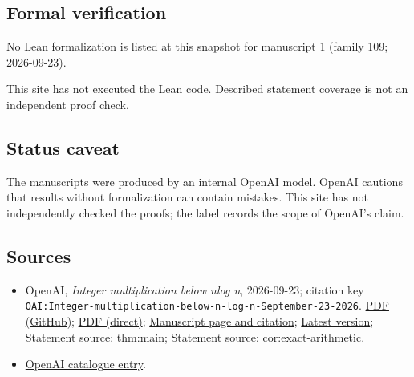 \documentclass[11pt]{article}
\begin{document}
\subsection{Formal verification}
No Lean formalization is listed at this snapshot for manuscript 1 (family 109; 2026-09-23).

This site has not executed the Lean code. Described statement coverage is not an independent proof check.

\subsection{Status caveat}
The manuscripts were produced by an internal OpenAI model. OpenAI cautions that results without formalization can contain mistakes. This site has not independently checked the proofs; the label records the scope of OpenAI's claim.

\subsection{Sources}
\begin{itemize}
\item OpenAI, \emph{Integer multiplication below nlog n}, 2026-09-23; citation key \texttt{OAI:Integer-multiplication-below-n-log-n-September-23-2026}. \href{https://github.com/openai/math/blob/adc7f1241b42e322a6451854ab7e4b4c146bf78a/preprints/Integer-multiplication-below-n-log-n-September-23-2026/paper.pdf}{PDF (GitHub)}; \href{https://github.com/openai/math/raw/adc7f1241b42e322a6451854ab7e4b4c146bf78a/preprints/Integer-multiplication-below-n-log-n-September-23-2026/paper.pdf}{PDF (direct)}; \href{https://github.com/openai/math/blob/adc7f1241b42e322a6451854ab7e4b4c146bf78a/preprints/Integer-multiplication-below-n-log-n-September-23-2026/README.md}{Manuscript page and citation}; \href{https://github.com/openai/math/blob/main/preprints/Integer-multiplication-below-n-log-n-September-23-2026/paper.pdf}{Latest version}; Statement source: \href{https://github.com/openai/math/blob/adc7f1241b42e322a6451854ab7e4b4c146bf78a/preprints/Integer-multiplication-below-n-log-n-September-23-2026/build/sections/00-introduction.tex\#L21}{thm:main}; Statement source: \href{https://github.com/openai/math/blob/adc7f1241b42e322a6451854ab7e4b4c146bf78a/preprints/Integer-multiplication-below-n-log-n-September-23-2026/build/sections/00-introduction.tex\#L194}{cor:exact-arithmetic}.
\item \href{https://github.com/openai/math/blob/adc7f1241b42e322a6451854ab7e4b4c146bf78a/CONTENTS.md}{OpenAI catalogue entry}.
\end{itemize}
\end{document}
